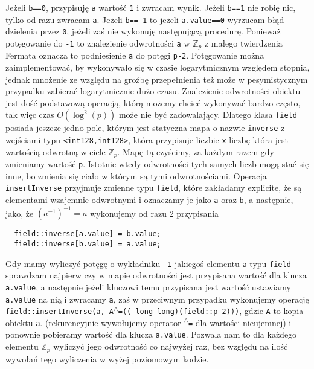 \documentclass{article}
\begin{document}
Jeżeli \texttt{b==0}, przypisuję \texttt{a} wartość \texttt{1} i zwracam wynik. Jeżeli \texttt{b==1} 
nie robię nic, tylko od razu zwracam \texttt{a}. Jeżeli \texttt{b==-1} to jeżeli \texttt{a.value==0} 
wyrzucam błąd dzielenia przez \texttt{0}, jeżeli zaś nie wykonuję następującą procedurę.
Ponieważ potęgowanie do \texttt{-1} to znalezienie odwrotności \texttt{a} w $\mathbb{Z}_p$
z małego twierdzenia Fermata oznacza to podniesienie \texttt{a} do potęgi 
\texttt{p-2}. Potęgowanie można zaimplementować, by wykonywało się w czasie logarytmicznym
względem stopnia, jednak mnożenie ze względu na groźbę przepełnienia
też może w pesymistycznym przypadku zabierać logarytmicznie dużo czasu.
Znalezienie odwrotności obiektu jest dość podstawową operacją, którą 
możemy chcieć wykonywać bardzo często, tak więc czas $O(\log ^2(p))$ może
nie być zadowalający. Dlatego klasa \texttt{field} posiada jeszcze jedno pole, którym
jest statyczna mapa o nazwie \texttt{inverse} z wejściami typu 
\texttt{<\texttt{\textunderscore \textunderscore int128},\texttt{\textunderscore \textunderscore int128}>}, która przypisuje 
liczbie \texttt{x} liczbę która jest wartością odwrotną w ciele $\mathbb{Z}_p$. Mapę tą
czyścimy, za każdym razem gdy zmieniamy wartość \texttt{p}. Istotnie wtedy odwrotności
tych samych liczb mogą stać się inne, bo zmienia się ciało w którym są tymi odwrotnościami.
Operacja \texttt{insertInverse} przyjmuje zmienne typu \texttt{field}, które zakładamy
explicite, że są elementami wzajemnie odwrotnymi i oznaczamy je jako \texttt{a} oraz \texttt{b}, 
a następnie, jako, że $(a^{-1})^{-1}=a$ wykonujemy od razu 2 przypisania
\begin{verbatim}
  field::inverse[a.value] = b.value;
  field::inverse[b.value] = a.value;
\end{verbatim}
Gdy mamy wyliczyć potęgę o wykładniku \texttt{-1} jakiegoś elementu \texttt{a} typu \texttt{field} sprawdzam 
najpierw czy w mapie odwrotności jest przypisana wartość dla klucza \texttt{a.value}, 
a następnie jeżeli kluczowi temu przypisana jest wartość ustawiamy \texttt{a.value} na nią i zwracamy \texttt{a}, zaś
w przeciwnym przypadku wykonujemy operację 
\texttt{field::insertInverse(a, A\textsuperscript{$\wedge$}=(( long long)(field::p-2)))}, gdzie \texttt{A} to kopia
obiektu \texttt{a}.
(rekurencyjnie wywołujemy operator \texttt{\textsuperscript{$\wedge$}=} dla wartości nieujemnej)
i ponownie pobieramy wartość dla klucza \texttt{a.value}. Pozwala nam to dla każdego elementu 
$\mathbb{Z}_p$ wyliczyć
jego odwrotność co najwyżej raz, bez względu na ilość wywołań tego wyliczenia w wyżej poziomowym 
kodzie. 
\end{document}

